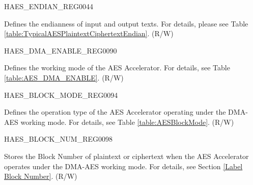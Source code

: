 \begin{register}{H}{AES\_ENDIAN\_REG}{\hexprefix{}0044}\label{regdesc:AESENDIANREG}
%
%
\regnewline%
\begin{regdesc}\begin{reglist}
\item [AES\_ENDIAN] Defines the endianness of input and output texts. For details, please see Table \ref{table:TypicalAESPlaintextCiphertextEndian}. (R/W)
\end{reglist}\end{regdesc}
\end{register}


\begin{register}{H}{AES\_DMA\_ENABLE\_REG}{\hexprefix{}0090}\label{regdesc:AESDMAENABLEREG}
%
%
\regnewline%
\begin{regdesc}\begin{reglist}
\item [AES\_DMA\_ENABLE] Defines the working mode of the AES Accelerator. For details, see Table \ref{table:AES_DMA_ENABLE}. (R/W)
\end{reglist}\end{regdesc}
\end{register}


\begin{register}{H}{AES\_BLOCK\_MODE\_REG}{\hexprefix{}0094}\label{regdesc:AESBLOCKMODEREG}
%
%
\regnewline%
\begin{regdesc}\begin{reglist}
\item [AES\_BLOCK\_MODE] Defines the operation type of the AES Accelerator operating under the DMA-AES working mode. For details, see Table \ref{table:AESBlockMode}. (R/W)
\end{reglist}\end{regdesc}
\end{register}


\begin{register}{H}{AES\_BLOCK\_NUM\_REG}{\hexprefix{}0098}\label{regdesc:AESBLOCKNUMREG}
%
\regnewline%
\begin{regdesc}\begin{reglist}
\item [AES\_BLOCK\_NUM] Stores the Block Number of plaintext or ciphertext when the AES Accelerator operates under the DMA-AES working mode. For details, see Section \ref{Label Block Number}. (R/W)
\end{reglist}\end{regdesc}
\end{register}


